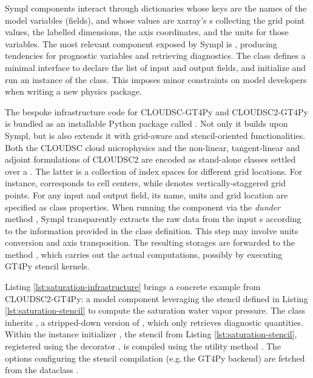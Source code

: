\documentclass[gmd,manuscript,online]{copernicus}
\theoremstyle{theorem}
\theoremstyle{definition}
\theoremstyle{remark}
\theoremstyle{proposition}
\begin{document}
	Sympl components interact through dictionaries whose keys are the names of the model variables (fields), and whose values are xarray's s \citep{hoyer17} collecting the grid point values, the labelled dimensions, the axis coordinates, and the units for those variables. The most relevant component exposed by Sympl is , producing tendencies for prognostic variables and retrieving diagnostics. The class defines a minimal interface to declare the list of input and output fields, and initialize and run an instance of the class. This imposes minor constraints on model developers when writing a new physics package.

	The bespoke infrastructure code for CLOUDSC-GT4Py and CLOUDSC2-GT4Py is bundled as an installable Python package called . Not only it builds upon Sympl, but is also extends it with grid-aware and stencil-oriented functionalities. Both the CLOUDSC cloud microphysics and the non-linear, tangent-linear and adjoint formulations of CLOUDSC2 are encoded as stand-alone  classes settled over a . The latter is a collection of index spaces for different grid locations. For instance,  corresponds to cell centers, while  denotes vertically-staggered grid points. For any input and output field, its name, units and grid location are specified as class properties. When running the component via the \emph{dunder} method , Sympl transparently extracts the raw data from the input s according to the information provided in the class definition. This step may involve units conversion and axis transposition. The resulting storages are forwarded to the method , which carries out the actual computations, possibly by executing GT4Py stencil kernels.

	Listing \ref{lst:saturation-infrastructure} brings a concrete example from CLOUDSC2-GT4Py: a model component leveraging the stencil defined in Listing \ref{lst:saturation-stencil} to compute the saturation water vapor pressure. The class inherits , a stripped-down version of , which only retrieves diagnostic quantities. Within the instance initializer , the stencil from Listing \ref{lst:saturation-stencil}, registered using the decorator , is compiled using the utility method . The options configuring the stencil compilation (e.g.\,the GT4Py backend) are fetched from the dataclass .
\end{document}
